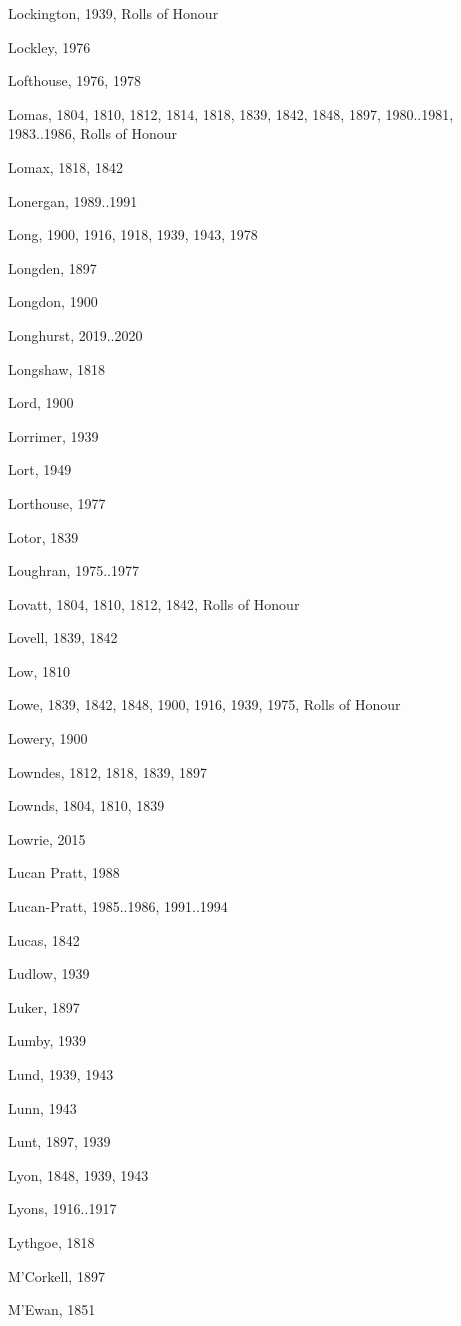 \begin{theindex}
\item Lockington, 1939, Rolls of Honour
\item Lockley, 1976
\item Lofthouse, 1976, 1978
\item Lomas, 1804, 1810, 1812, 1814, 1818, 1839, 1842, 1848, 1897, 1980..1981, 1983..1986, Rolls of Honour
\item Lomax, 1818, 1842
\item Lonergan, 1989..1991
\item Long, 1900, 1916, 1918, 1939, 1943, 1978
\item Longden, 1897
\item Longdon, 1900
\item Longhurst, 2019..2020
\item Longshaw, 1818
\item Lord, 1900
\item Lorrimer, 1939
\item Lort, 1949
\item Lorthouse, 1977
\item Lotor, 1839
\item Loughran, 1975..1977
\item Lovatt, 1804, 1810, 1812, 1842, Rolls of Honour
\item Lovell, 1839, 1842
\item Low, 1810
\item Lowe, 1839, 1842, 1848, 1900, 1916, 1939, 1975, Rolls of Honour
\item Lowery, 1900
\item Lowndes, 1812, 1818, 1839, 1897
\item Lownds, 1804, 1810, 1839
\item Lowrie, 2015
\item Lucan Pratt, 1988
\item Lucan-Pratt, 1985..1986, 1991..1994
\item Lucas, 1842
\item Ludlow, 1939
\item Luker, 1897
\item Lumby, 1939
\item Lund, 1939, 1943
\item Lunn, 1943
\item Lunt, 1897, 1939
\item Lyon, 1848, 1939, 1943
\item Lyons, 1916..1917
\item Lythgoe, 1818
\item M'Corkell, 1897
\item M'Ewan, 1851

\end{theindex}
